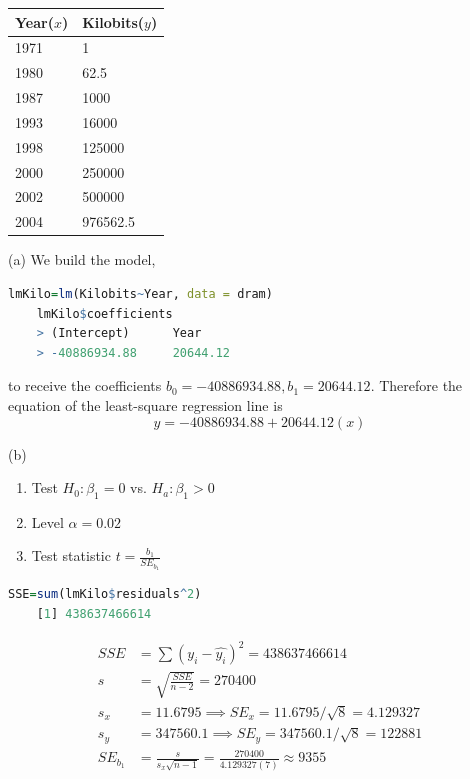 \documentclass[boxes, qed]{homework}
\begin{document}
\begin{problem}
  \begin{tabular}{l|l}\hline
    Year($x$) & Kilobits($y$)\\\hline
    1971&1\\\hline
    1980&62.5\\\hline
    1987&1000\\\hline
    1993&16000\\\hline
    1998&125000\\\hline
    2000&250000\\\hline
    2002&500000\\\hline
    2004&976562.5\\\hline
  \end{tabular}
\end{problem}
\begin{solution}(a) We build the model,
  \begin{lstlisting}[backgroundcolor = \color{lightgray},language = R]
    lmKilo=lm(Kilobits~Year, data = dram)
    lmKilo$coefficients
    > (Intercept)      Year 
    > -40886934.88     20644.12
  \end{lstlisting}
  to receive the coefficients $b_0=-40886934.88, b_1=20644.12$.
  Therefore the equation of the least-square regression line is
  $$\hat{y}=-40886934.88 + 20644.12(x)$$

  (b)\begin{enumerate}
    \item Test $H_0: \beta_1=0$ vs. $H_a:\beta_1>0$
    \item Level $\alpha=0.02$
    \item Test statistic $t=\frac{b_1}{SE_{b_1}}$
  \end{enumerate}

  \begin{lstlisting}[backgroundcolor = \color{lightgray},language = R]
    SSE=sum(lmKilo$residuals^2)
    [1] 438637466614
  \end{lstlisting}

  \begin{align*}
    SSE &= \sum(y_i-\hat{y_i})^2 = 438637466614\\
    s &= \sqrt{\frac{SSE}{n-2}} = 270400\\
    s_x &= 11.6795 \implies SE_x=11.6795/\sqrt{8} = 4.129327\\
    s_y &= 347560.1 \implies SE_y=347560.1/\sqrt{8} = 122881\\
    SE_{b_1} &= \frac{s}{s_x\sqrt{n-1}}
      = \frac{270400}{4.129327(7)}
      \approx 9355
  \end{align*}
  

\end{solution}
\end{document}
